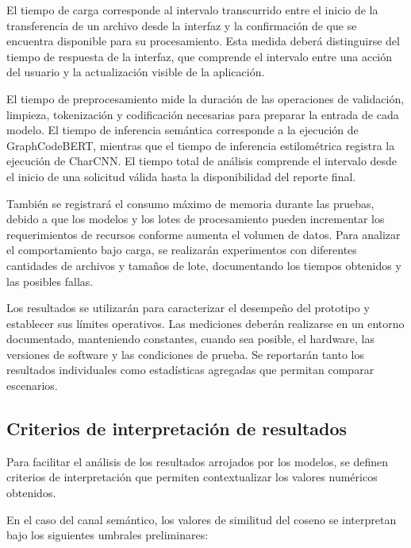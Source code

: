El tiempo de carga corresponde al intervalo transcurrido entre el inicio de la transferencia de un archivo desde la interfaz y la confirmación de que se encuentra disponible para su procesamiento. Esta medida deberá distinguirse del tiempo de respuesta de la interfaz, que comprende el intervalo entre una acción del usuario y la actualización visible de la aplicación.

El tiempo de preprocesamiento mide la duración de las operaciones de validación, limpieza, tokenización y codificación necesarias para preparar la entrada de cada modelo. El tiempo de inferencia semántica corresponde a la ejecución de GraphCodeBERT, mientras que el tiempo de inferencia estilométrica registra la ejecución de CharCNN. El tiempo total de análisis comprende el intervalo desde el inicio de una solicitud válida hasta la disponibilidad del reporte final.

También se registrará el consumo máximo de memoria durante las pruebas, debido a que los modelos y los lotes de procesamiento pueden incrementar los requerimientos de recursos conforme aumenta el volumen de datos. Para analizar el comportamiento bajo carga, se realizarán experimentos con diferentes cantidades de archivos y tamaños de lote, documentando los tiempos obtenidos y las posibles fallas.

Los resultados se utilizarán para caracterizar el desempeño del prototipo y establecer sus límites operativos. Las mediciones deberán realizarse en un entorno documentado, manteniendo constantes, cuando sea posible, el hardware, las versiones de software y las condiciones de prueba. Se reportarán tanto los resultados individuales como estadísticas agregadas que permitan comparar escenarios.

\subsection{Criterios de interpretación de resultados}

Para facilitar el análisis de los resultados arrojados por los modelos, se definen criterios de interpretación que permiten contextualizar los valores numéricos obtenidos.

En el caso del canal semántico, los valores de similitud del coseno se interpretan bajo los siguientes umbrales preliminares:

